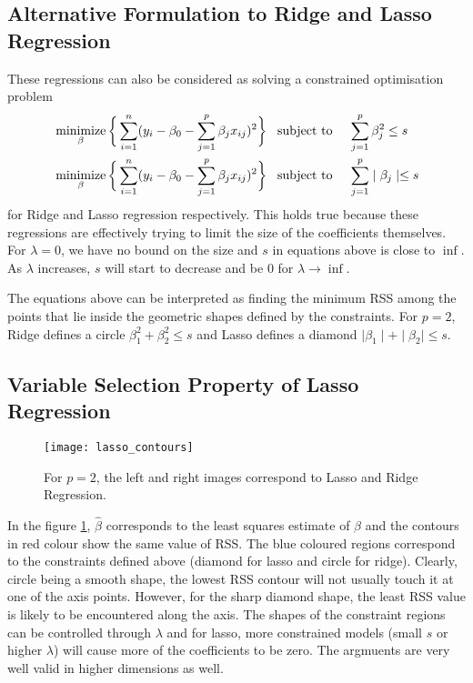 \documentclass[../statistical_learning_notes.tex]{subfiles}
\begin{document}
    \subsection{Alternative Formulation to Ridge and Lasso Regression}
    These regressions can also be considered as solving a constrained optimisation problem
    \begin{align*}
        &\operatorname*{minimize}_{\beta}  \bigg\{\sum_{i=1}^{n} (y_{i} - \beta_{0} - \sum_{j=1}^{p}\beta_{j}x_{ij})^{2} \bigg\} \text{\;\;\;subject to\;} &&\sum_{j=1}^{p}\beta_{j}^{2} \leq s \\
        &\operatorname*{minimize}_{\beta}  \bigg\{\sum_{i=1}^{n} (y_{i} - \beta_{0} - \sum_{j=1}^{p}\beta_{j}x_{ij})^{2} \bigg\} \text{\;\;\;subject to\;} &&\sum_{j=1}^{p}\mid \beta_{j} \mid \leq s
    \end{align*}
    for Ridge and Lasso regression respectively. This holds true because these regressions are effectively trying to limit the size of the coefficients themselves. For $\lambda = 0$, we have no bound on the size and $s$ in equations above is close to $\inf$. As $\lambda$ increases, $s$ will start to decrease and be $0$ for $\lambda \to \inf$. \newline

    The equations above can be interpreted as finding the minimum RSS among the points that lie inside the geometric shapes defined by the constraints. For $p = 2$, Ridge defines a circle $\beta_{1}^{2} + \beta_{2}^{2} \leq s$ and Lasso defines a diamond $\mid \beta_{1} \mid + \mid \beta_{2} \mid \leq s$.

    
    \subsection{Variable Selection Property of Lasso Regression}
    \begin{figure}[h]
    \texttt{[image: lasso\_contours]}
    \centering
    \caption{For $p=2$, the left and right images correspond to Lasso and Ridge Regression.}
    \label{fig:lasso_contour} %
    \end{figure}

    In the figure \ref{fig:lasso_contour}, $\hat{\beta}$ corresponds to the least squares estimate of $\beta$ and the contours in red colour show the same value of RSS. The blue coloured regions correspond to the constraints defined above (diamond for lasso and circle for ridge).\newline
    Clearly, circle being a smooth shape, the lowest RSS contour will not usually touch it at one of the axis points. However, for the sharp diamond shape, the least RSS value is likely to be encountered along the axis. The shapes of the constraint regions can be controlled through $\lambda$ and for lasso, more constrained models (small $s$ or higher $\lambda$) will cause more of the coefficients to be zero. The argmuents are very well valid in higher dimensions as well.
    
\end{document}
